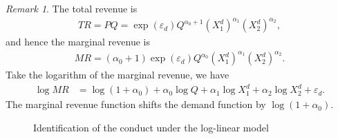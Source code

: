 \documentclass[11pt, a4paper]{article}
\theoremstyle{remark}
\newtheorem{remark}{Remark}
\begin{document}
\begin{remark}

The total revenue is
\begin{align}
    TR = PQ = \exp(\varepsilon_{d}) Q^{\alpha_0+1} (X_{1}^{d})^{\alpha_1}(X_{2}^{d})^{\alpha_2},
\end{align}
and hence the marginal revenue is
\begin{align}
    MR = (\alpha_0+1)\exp(\varepsilon_{d}) Q^{\alpha_0}  (X_{1}^{d})^{\alpha_1}(X_{2}^{d})^{\alpha_2}.
\end{align}
Take the logarithm of the marginal revenue, we have
\begin{align}
    \log MR& = \log (1 + \alpha_0) + \alpha_0 \log Q + \alpha_1 \log X_{1}^{d} + \alpha_2 \log X_{2}^{d} + \varepsilon_d.
\end{align}
The marginal revenue function shifts the demand function by $\log (1 + \alpha_0)$.
\end{remark}

\begin{figure}[t]
    \centering
        \caption{}
    \caption{Identification of the conduct under the log-linear model}
    \label{fig:simpe_identification}
\end{figure}
\end{document}
